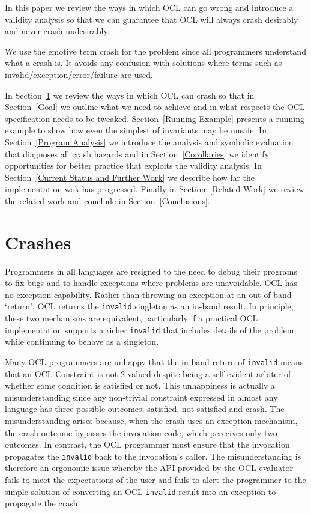\documentclass{llncs}
\begin{document}
In this paper we review the ways in  which OCL can go wrong and introduce a validity analysis so that we can guarantee that OCL will always crash desirably and never crash undesirably.

We use the emotive term crash for the problem since all programmers understand what a crash is. It avoids any confusion with solutions where terms such as invalid/exception/error/failure are used.

In Section~\ref{Crashes} we review the ways in which OCL can crash so that in Section~\ref{Goal} we outline what we need to achieve and in what respects the OCL specification needs to be tweaked. Section~\ref{Running Example} presents a running example to show how even the simplest of invariants may be unsafe. In Section~\ref{Program Analysis} we introduce the analysis and symbolic evaluation that diagnoses all crash hazards and in Section~\ref{Corollaries} we identify opportunities for better practice that exploits the validity analysis. In Section~\ref{Current Status and Further Work} we describe how far the implementation wok has progressed.  Finally in Section~\ref{Related Work} we review the related work and conclude in Section~\ref{Conclusions}.

\section{Crashes}\label{Crashes}

Programmers in all languages are resigned to the need to debug their programs to fix bugs and to handle exceptions where problems are unavoidable. OCL has no exception capability. Rather than throwing an exception at an out-of-band `return', OCL returns the \verb|invalid| singleton as an in-band result. In principle, these two mechanisms are equivalent, particularly if a practical OCL implementation supports a richer \verb|invalid| that includes details of the problem while continuing to behave as a singleton.

Many OCL programmers are unhappy that the in-band return of \verb|invalid| means that an OCL Constraint is not 2-valued despite being a self-evident arbiter of whether some condition is satisfied or not. This unhappiness is actually a misunderstanding since any non-trivial constraint expressed in almost any language has three possible outcomes; satisfied, not-satisfied and crash. The misunderstanding arises because, when the crash uses an exception mechanism, the crash outcome bypasses the invocation code, which perceives only two outcomes. In contrast, the OCL programmer must ensure that the invocation propagates the \verb|invalid| back to the invocation's caller. The misunderstanding is therefore an ergonomic issue whereby the API provided by the OCL evaluator fails to meet the expectations of the user and fails to alert the programmer to the simple solution of converting an OCL \verb|invalid| result into an exception to propagate the crash.
\end{document}
